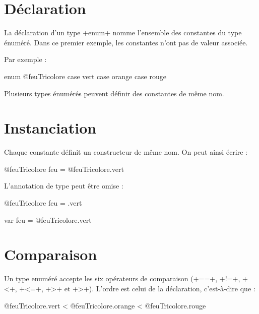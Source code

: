 




\section{Déclaration}

La déclaration d'un type \ggst+enum+ nomme l'ensemble des constantes du type énuméré. Dans ce premier exemple, les constantes n'ont pas de valeur associée.

Par exemple :

\begin{galgas34}
enum @feuTricolore {
  case vert
  case orange
  case rouge
}
\end{galgas34}

Plusieurs types énumérés peuvent définir des constantes de même nom.

\section{Instanciation}

Chaque constante définit un constructeur de même nom. On peut ainsi écrire :

\begin{galgas3}
@feuTricolore feu = @feuTricolore.vert
\end{galgas3}

L'annotation de type peut être omise :

\begin{galgas3}
@feuTricolore feu = .vert
\end{galgas3}

\begin{galgas3}
var feu = @feuTricolore.vert
\end{galgas3}

\section{Comparaison}

Un type enuméré accepte les six opérateurs de comparaison (\ggst+==+, \ggst+!=+, \ggst+<+, \ggst+<=+, \ggst+>+ et \ggst+>+). L'ordre est celui de la déclaration, c'est-à-dire que :
\begin{galgas3}
  @feuTricolore.vert < @feuTricolore.orange < @feuTricolore.rouge
\end{galgas3}


